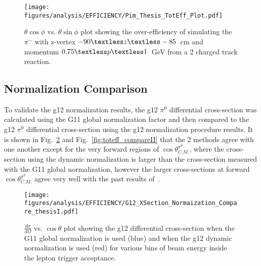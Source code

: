 \begin{figure}[h!]\begin{center}
		\texttt{[image: \\figures/analysis/EFFICIENCY/Pim\_Thesis\_TotEff\_Plot.pdf]}
		\caption[$\theta \cos\phi$ vs. $\theta \sin\phi$ plot showing the over-efficiency of simulating the $\pi^-$ with z-vertex $-90\textless z\textless-85$~cm and momentum $0.75\textless p \textless 1$~GeV from a 2 charged track reaction]{\label{fig:toteff_pim} $\theta \cos\phi$ vs. $\theta \sin\phi$ plot showing the over-efficiency of simulating the $\pi^-$ with z-vertex $-90\textless z\textless-85$~cm and momentum $0.75\textless p \textless 1$~GeV from a 2 charged track reaction.}
\end{center}\end{figure}
\FloatBarrier
%
\subsection{Normalization Comparison}
To validate the g12 normalization results, the g12 $\pi^0$ differential cross-section was calculated using the G11 global normalization factor and then compared to the g12 $\pi^0$ differential cross-section using the g12 normalization procedure results. It is shown in Fig.~\ref{fig:toteff_compareI} and Fig.~\ref{fig:toteff_compareII} that the 2 methods agree with one another except for the very forward regions of $\cos\theta^{\pi^0}_{C.M.}$, where the cross-section using the dynamic normalization is larger than the cross-section measured with the G11 global normalization, however the larger cross-sections at forward $\cos\theta^{\pi^0}_{C.M.}$ agree very well with the past results of~\cite{ELSA11}.

\begin{figure}[h!]\begin{center}
\texttt{[image: \\figures/analysis/EFFICIENCY/G12\_XSection\_Normaization\_Compare\_thesisI.pdf]}
\caption[$\frac{d \sigma}{d \Omega}$ vs. $\cos \theta$ plot showing the g12 \pizT differential cross-section when the G11 global normalization is used (blue) and when the g12 dynamic normalization is used (red) for various bins of beam energy inside lepton trigger acceptance]{\label{fig:toteff_compareI} $\frac{d \sigma}{d \Omega}$ vs. $\cos \theta$ plot showing the g12 \pizT differential cross-section when the G11 global normalization is used (blue) and when the g12 dynamic normalization is used (red) for various bins of beam energy inside the lepton trigger acceptance.}
\end{center}\end{figure}

